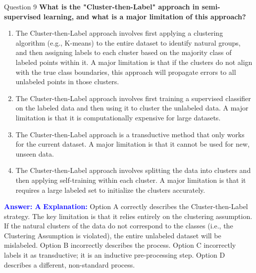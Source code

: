 \documentclass[8pt]{beamer}  %
\begin{document}
	\begin{frame}{Question 9}
		\textbf{What is the "Cluster-then-Label" approach in semi-supervised learning, and what is a major limitation of this approach?}
		\begin{enumerate}
			\item The Cluster-then-Label approach involves first applying a clustering algorithm (e.g., K-means) to the entire dataset to identify natural groups, and then assigning labels to each cluster based on the majority class of labeled points within it. A major limitation is that if the clusters do not align with the true class boundaries, this approach will propagate errors to all unlabeled points in those clusters.
			\item The Cluster-then-Label approach involves first training a supervised classifier on the labeled data and then using it to cluster the unlabeled data. A major limitation is that it is computationally expensive for large datasets.
			\item The Cluster-then-Label approach is a transductive method that only works for the current dataset. A major limitation is that it cannot be used for new, unseen data.
			\item The Cluster-then-Label approach involves splitting the data into clusters and then applying self-training within each cluster. A major limitation is that it requires a large labeled set to initialize the clusters accurately.
		\end{enumerate}
		\vspace{0.2cm}
		\textcolor{blue}{\textbf{Answer: A}}
		\vspace{0.2cm}
		\textcolor{blue}{\textbf{Explanation:}} Option A correctly describes the Cluster-then-Label strategy. The key limitation is that it relies entirely on the clustering assumption. If the natural clusters of the data do not correspond to the classes (i.e., the Clustering Assumption is violated), the entire unlabeled dataset will be mislabeled. Option B incorrectly describes the process. Option C incorrectly labels it as transductive; it is an inductive pre-processing step. Option D describes a different, non-standard process.
	\end{frame}
	
\end{document}
